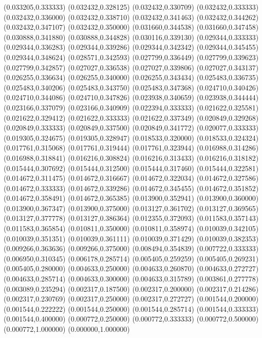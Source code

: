 (0.033205,0.333333)
(0.032432,0.328125)
(0.032432,0.330709)
(0.032432,0.333333)
(0.032432,0.336000)
(0.032432,0.338710)
(0.032432,0.341463)
(0.032432,0.344262)
(0.032432,0.347107)
(0.032432,0.350000)
(0.031660,0.344538)
(0.031660,0.347458)
(0.030888,0.341880)
(0.030888,0.344828)
(0.030116,0.339130)
(0.029344,0.333333)
(0.029344,0.336283)
(0.029344,0.339286)
(0.029344,0.342342)
(0.029344,0.345455)
(0.029344,0.348624)
(0.028571,0.342593)
(0.027799,0.336449)
(0.027799,0.339623)
(0.027799,0.342857)
(0.027027,0.336538)
(0.027027,0.339806)
(0.027027,0.343137)
(0.026255,0.336634)
(0.026255,0.340000)
(0.026255,0.343434)
(0.025483,0.336735)
(0.025483,0.340206)
(0.025483,0.343750)
(0.025483,0.347368)
(0.024710,0.340426)
(0.024710,0.344086)
(0.024710,0.347826)
(0.023938,0.340659)
(0.023938,0.344444)
(0.023166,0.337079)
(0.023166,0.340909)
(0.022394,0.333333)
(0.021622,0.325581)
(0.021622,0.329412)
(0.021622,0.333333)
(0.021622,0.337349)
(0.020849,0.329268)
(0.020849,0.333333)
(0.020849,0.337500)
(0.020849,0.341772)
(0.020077,0.333333)
(0.019305,0.324675)
(0.019305,0.328947)
(0.018533,0.320000)
(0.018533,0.324324)
(0.017761,0.315068)
(0.017761,0.319444)
(0.017761,0.323944)
(0.016988,0.314286)
(0.016988,0.318841)
(0.016216,0.308824)
(0.016216,0.313433)
(0.016216,0.318182)
(0.015444,0.307692)
(0.015444,0.312500)
(0.015444,0.317460)
(0.015444,0.322581)
(0.014672,0.311475)
(0.014672,0.316667)
(0.014672,0.322034)
(0.014672,0.327586)
(0.014672,0.333333)
(0.014672,0.339286)
(0.014672,0.345455)
(0.014672,0.351852)
(0.014672,0.358491)
(0.014672,0.365385)
(0.013900,0.352941)
(0.013900,0.360000)
(0.013900,0.367347)
(0.013900,0.375000)
(0.013127,0.361702)
(0.013127,0.369565)
(0.013127,0.377778)
(0.013127,0.386364)
(0.012355,0.372093)
(0.011583,0.357143)
(0.011583,0.365854)
(0.010811,0.350000)
(0.010811,0.358974)
(0.010039,0.342105)
(0.010039,0.351351)
(0.010039,0.361111)
(0.010039,0.371429)
(0.010039,0.382353)
(0.009266,0.363636)
(0.009266,0.375000)
(0.008494,0.354839)
(0.007722,0.333333)
(0.006950,0.310345)
(0.006178,0.285714)
(0.005405,0.259259)
(0.005405,0.269231)
(0.005405,0.280000)
(0.004633,0.250000)
(0.004633,0.260870)
(0.004633,0.272727)
(0.004633,0.285714)
(0.004633,0.300000)
(0.004633,0.315789)
(0.003861,0.277778)
(0.003089,0.235294)
(0.002317,0.187500)
(0.002317,0.200000)
(0.002317,0.214286)
(0.002317,0.230769)
(0.002317,0.250000)
(0.002317,0.272727)
(0.001544,0.200000)
(0.001544,0.222222)
(0.001544,0.250000)
(0.001544,0.285714)
(0.001544,0.333333)
(0.001544,0.400000)
(0.000772,0.250000)
(0.000772,0.333333)
(0.000772,0.500000)
(0.000772,1.000000)
(0.000000,1.000000)